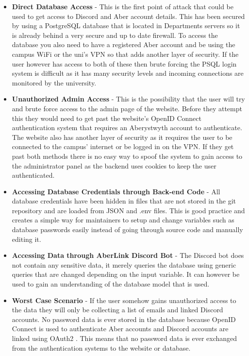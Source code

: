 \begin{itemize}
	\item \textbf{Direct Database Access} - This is the first point of attack that could be used to get access to Discord and Aber account details. This has been secured by using a PostgreSQL \cite{psql} database that is located in Departments servers so it is already behind a very secure and up to date firewall. To access the database you also need to have a registered Aber account and be using the campus WiFi or the uni's VPN so that adds another layer of security. If the user however has access to both of these then brute forcing the PSQL login system is difficult as it has many security levels and incoming connections are monitored by the university.
	\item \textbf{Unauthorized Admin Access} - This is the possibility that the user will try and brute force access to the admin page of the website. Before they attempt this they would need to get past the website's OpenID Connect \cite{OpenID} authentication system that requires an Aberystwyth account to authenticate. The website also has another layer of security as it requires the user to be connected to the campus' internet or be logged in on the VPN. If they get past both methods there is no easy way to spoof the system to gain access to the administrator panel as the backend uses cookies to keep the user authenticated.
	\item \textbf{Accessing Database Credentials through Back-end Code} - All database credentials have been hidden in files that are not stored in the git repository and are loaded from JSON and .env files. This is good practice and creates a simple way for maintainers to setup and change variables such as database passwords easily instead of going through source code and manually editing it.
	\item \textbf{Accessing Data through AberLink Discord Bot} - The Discord bot does not contain any sensitive data, it merely queries the database using generic queries that are changed depending on the input variable. It can however be used to gain an understanding of the database model that is used.
	\item \textbf{Worst Case Scenario} - If the user somehow gains unauthorized access to the data they will only be collecting a list of emails and linked Discord accounts. No password data is ever stored in the database because  OpenID Connect \cite{OpenID} is used to authenticate Aber accounts and Discord accounts are linked using OAuth2 \cite{oauth2}. This means that no password data is ever exchanged from the authentication systems to the website or database.
\end{itemize}


